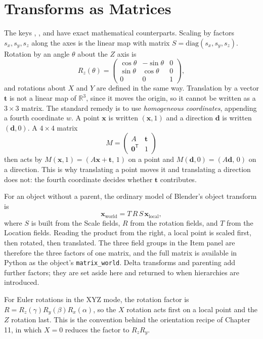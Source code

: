 \section{Transforms as Matrices}

The keys , , and  have exact mathematical counterparts. Scaling by factors $s_x,s_y,s_z$ along the axes is the linear map with matrix $S=\mathrm{diag}(s_x,s_y,s_z)$. Rotation by an angle $\theta$ about the $Z$ axis is
\[
  R_z(\theta)=\begin{pmatrix}
    \cos\theta&-\sin\theta&0\\
    \sin\theta&\cos\theta&0\\
    0&0&1
  \end{pmatrix},
\]
and rotations about $X$ and $Y$ are defined in the same way. Translation by a vector $\mathbf t$ is not a linear map of $\mathbb R^3$, since it moves the origin, so it cannot be written as a $3\times3$ matrix. The standard remedy is to use \emph{homogeneous coordinates}, appending a fourth coordinate $w$. A point $\mathbf x$ is written $(\mathbf x,1)$ and a direction $\mathbf d$ is written $(\mathbf d,0)$. A $4\times4$ matrix
\[
  M=\begin{pmatrix}A&\mathbf t\\ \mathbf 0^{\mathsf T}&1\end{pmatrix}
\]
then acts by $M(\mathbf x,1)=(A\mathbf x+\mathbf t,\,1)$ on a point and $M(\mathbf d,0)=(A\mathbf d,\,0)$ on a direction. This is why translating a point moves it and translating a direction does not: the fourth coordinate decides whether $\mathbf t$ contributes.

For an object without a parent, the ordinary model of Blender's object transform is
\[
  \mathbf x_{\mathrm{world}}=T\,R\,S\,\mathbf x_{\mathrm{local}},
\]
where $S$ is built from the Scale fields, $R$ from the rotation fields, and $T$ from the Location fields. Reading the product from the right, a local point is scaled first, then rotated, then translated. The three field groups in the Item panel are therefore the three factors of one matrix, and the full matrix is available in Python as the object's \texttt{matrix\_world}. Delta transforms and parenting add further factors; they are set aside here and returned to when hierarchies are introduced.

For Euler rotations in the XYZ mode, the rotation factor is $R=R_z(\gamma)R_y(\beta)R_x(\alpha)$, so the $X$ rotation acts first on a local point and the $Z$ rotation last. This is the convention behind the orientation recipe of Chapter 11, in which $X=0$ reduces the factor to $R_z R_y$.

